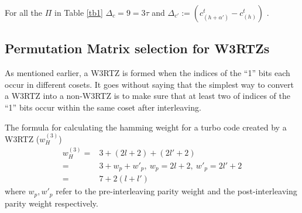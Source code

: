 For all the $\Pi$ in Table \ref{tb1} $\Delta_c = 9=3\tau$ and $\Delta_{c'}:=(c_{(h+\alpha')}^{t}-c_{(h)}^{t})$ .






\subsection{Permutation Matrix selection for W3RTZs}
As mentioned earlier, a W3RTZ is formed when the indices of the ``1'' bits each occur in different cosets.  It goes without saying that the simplest way to convert a W3RTZ into a non-W3RTZ is to make sure that at least two of indices of the ``1'' bits occur within the same coset after interleaving. 

The formula for calculating the hamming weight for a turbo code created by a W3RTZ ($w^{(3)}_H$)
\begin{equation}
\begin{split}
w^{(3)}_H=& 3+(2l+2)+(2l'+2)\\
=&3+w_p+w'_p,~w_p=2l+2,~w'_p=2l'+2\\
=&7+2(l+l')
\end{split}
\label{eq6}
\end{equation}
where $w_p,w'_p$ refer to the pre-interleaving parity weight and the post-interleaving parity weight respectively.

